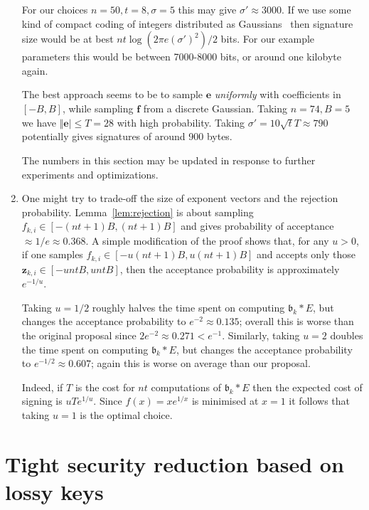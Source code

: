 \documentclass{llncs}
\renewcommand{\b}{\mathfrak{b}}
\newcommand{\e}{\mathbf{e}}
\newcommand{\f}{\mathbf{f}}
\newcommand{\z}{\mathbf{z}}
\begin{document}
\begin{enumerate}
For our choices $n=50, t = 8, \sigma = 5$ this may give $\sigma' \approx 3000$.
If we use some kind of compact coding of integers distributed as Gaussians~\cite{DDLL13} then signature size would be at best $nt \log( 2 \pi e (\sigma')^2 )/2$ bits.
For our example parameters this would be between 7000-8000 bits, or around one kilobyte again.

The best approach seems to be to sample $\e$ \emph{uniformly} with coefficients in $[-B, B]$, while sampling $\f$ from a discrete Gaussian. Taking $n=74, B = 5$ we have $\Vert \e \vert \le T = 28$ with high probability. Taking $\sigma' = 10 \sqrt{t} T \approx 790$ potentially gives signatures of around 900 bytes.

The numbers in this section may be updated in response to further experiments and optimizations.

\item One might try to trade-off the size of exponent vectors and the rejection probability. Lemma~\ref{lem:rejection} is about sampling $f_{k,i} \in [ -(nt+1)B, (nt+1)B ]$ and gives probability of acceptance $\approx 1/e \approx 0.368$.
A simple modification of the proof shows that, for any $u > 0$, if one samples $f_{k,i} \in [ -u(nt+1)B, u(nt+1)B ]$ and accepts only those $\z_{k,i} \in [ -untB, untB ]$, then the acceptance probability is approximately $e^{-1/u}$.

Taking $u = 1/2$ roughly halves the time spent on computing $\b_k * E$, but changes the acceptance probability to $e^{-2}  \approx 0.135$; overall this is worse than the original proposal since $2 e^{-2} \approx 0.271 < e^{-1}$.
Similarly, taking $u = 2$ doubles the time spent on computing $\b_k * E$, but changes the acceptance probability to $e^{-1/2} \approx 0.607$; again this is worse on average than our proposal.

Indeed, if $T$ is the cost for $nt$ computations of $\b_k * E$ then the expected cost of signing is $u T e^{1/u}$. Since $f(x) = x e^{1/x}$ is minimised at $x=1$ it follows that taking $u=1$ is the optimal choice.

\end{enumerate}


\section{Tight security reduction based on lossy keys}\label{sec:lossy-keys}
\end{document}

